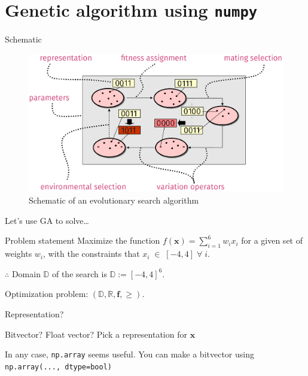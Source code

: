 \documentclass[presentation]{beamer}
\begin{document}
\section{Genetic algorithm using \texttt{numpy}}
\label{sec:org9f358bb}
\begin{frame}[label={sec:orgec5522e}]{Schematic}
\footnotesize
\begin{figure}[htbp]
\centering
\includegraphics[width=1.0\textwidth]{images/ga_schematic.png}
\caption{Schematic of an evolutionary search algorithm}
\end{figure}
\end{frame}
\begin{frame}[label={sec:org71af0f5}]{Let's use GA to solve\ldots{}}
\begin{block}{Problem statement}
Maximize the function \(f(\mathbf{x}) = \sum_{i=1}^{6} w_i x_i\) for a given
set of weights \(w_i\), with the constraints that \(x_i \; \in \; [-4,4] \;
   \forall \; i\).

\(\therefore\) Domain \(\mathbb{D}\) of the search is \(\mathbb{D}:= [-4,4]^6\).

Optimization problem: \(\left(\mathbb{D}, \mathbb{R} , \mathbf{f}, \geq \right)\).
\end{block}
\end{frame}
\begin{frame}[label={sec:org9f1ea4f},fragile]{Representation?}
 \begin{block}{Bitvector? Float vector?}
Pick a representation for \(\mathbf{x}\)
\end{block}
In any case, \texttt{np.array} seems useful. You can make a bitvector using
\texttt{np.array(..., dtype=bool)}
\end{frame}
\end{document}
